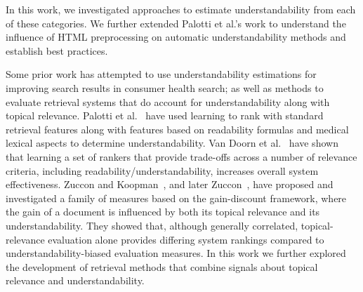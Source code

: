 In this work, we investigated approaches to estimate understandability from each of these categories. We further extended Palotti et al.'s work to understand the influence of HTML preprocessing on automatic understandability methods and establish best practices. 

Some prior work has attempted to use understandability estimations for improving search results in consumer health search; as well as methods to evaluate retrieval systems that do account for understandability along with topical relevance. Palotti et al.~\cite{palotti2016ranking} have used learning to rank with standard retrieval features along with features based on readability formulas and medical lexical aspects to determine understandability. Van Doorn et al.~\cite{van2016balancing} have shown that learning a set of rankers that provide trade-offs across a number of relevance criteria, including readability/understandability, increases overall system effectiveness.   
Zuccon and Koopman~\cite{zuccon14}, and later Zuccon~\cite{zuccon2016understandability}, have proposed and investigated a family of measures based on the gain-discount framework, where the gain of a document is influenced by both its topical relevance and its understandability. They showed that, although generally correlated, topical-relevance evaluation alone provides differing system rankings compared to understandability-biased evaluation measures. 
In this work we further explored the development of retrieval methods that combine signals about topical relevance and understandability. 


